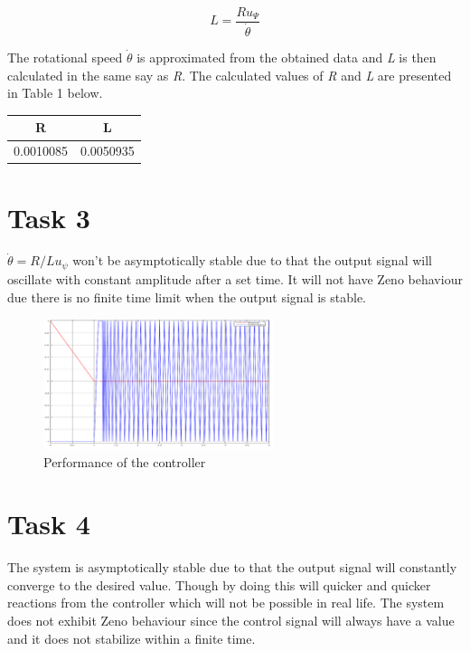 \documentclass[a4paper,12pt,oneside,onecolumn]{article} %
\begin{document}
\begin{equation}
L = \frac{Ru_\Psi}{\dot{\theta}}
\end{equation}

The rotational speed $\dot{\theta}$ is approximated from the obtained data and \emph{L} is then calculated in the same say as \emph{R}. The calculated values of \emph{R} and \emph{L} are presented in Table 1 below. 
\begin{center}
	\begin{tabular}{| c | c |}
	\hline
	R & L \\ \hline
	0.0010085 & 0.0050935 \\ \hline
	
	\end{tabular}
\end{center}

\section*{Task 3}

$\dot{\theta} = R/L u_\psi$ won't be asymptotically stable due to that the output signal will oscillate with constant amplitude after a set time. It will not have Zeno behaviour due there is no finite time limit when the output signal is stable. 

\begin{figure}[H]
\begin{center}	
  \includegraphics[width = 0.6\textwidth]{rot1.png}
  \caption{Performance of the controller}
  
 \end{center}
\end{figure}


\section*{Task 4}

The system is asymptotically stable due to that the output signal will constantly converge to the desired value. Though by doing this will quicker and quicker reactions from the controller which will not be possible in real life. The system does not exhibit Zeno behaviour since the control signal will always have a value and it does not stabilize within a finite time. 
\end{document}

